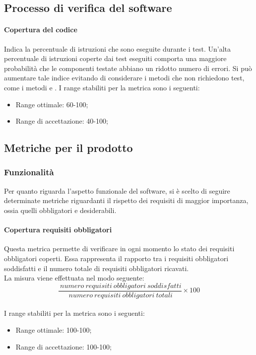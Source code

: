 				\subsection[Processo di verifica del software]{\hypertarget{pvs}{Processo di verifica del software}}
				
			\paragraph[Copertura del codice]{\hypertarget{cco}{Copertura del codice}}
			Indica la percentuale di istruzioni che sono eseguite durante i test. Un'alta percentuale di istruzioni coperte dai test eseguiti comporta una maggiore probabilità che le componenti testate abbiano un ridotto numero di errori. Si può aumentare tale indice evitando di considerare i metodi che non richiedono test, come i metodi \textit{} e \textit{}.
			I range stabiliti per la metrica sono i seguenti:
				\begin{itemize}
					\item Range ottimale: 60-100;
					\item Range di accettazione: 40-100;
				\end{itemize}
				
	\subsection{Metriche per il prodotto}
		\subsubsection{Funzionalità \label{S1}}
		Per quanto riguarda l'aspetto funzionale del software, si è scelto di seguire determinate metriche riguardanti il rispetto dei requisiti di maggior importanza, ossia quelli obbligatori e desiderabili.
			\paragraph[Copertura requisiti obbligatori]{\hypertarget{cro}{Copertura requisiti obbligatori}}
			Questa metrica permette di verificare in ogni momento lo stato dei requisiti obbligatori coperti. Essa rappresenta il rapporto tra i requisiti obbligatori soddisfatti e il numero totale di requisiti obbligatori ricavati.
			\\La misura viene effettuata nel modo seguente:
			\begin{equation}
			\frac{~numero~requisiti~obbligatori~soddisfatti}{~numero~requisiti~obbligatori~totali}\times{100}
			\end{equation}
			\\I range stabiliti per la metrica sono i seguenti:
			\begin{itemize}
				\item Range ottimale: 100-100;
				\item Range di accettazione: 100-100;
			\end{itemize}
			
